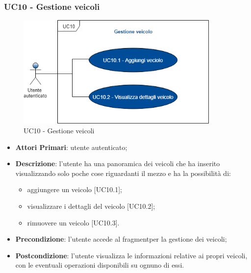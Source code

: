  \subsubsection{UC10 - Gestione veicoli}
  \begin{figure}[H]
 	\includegraphics[width=10cm]{res/images/UC10Gestioneveicolo.png}
 	\centering
 	\caption{UC10 - Gestione veicoli}
 \end{figure}
 \begin{itemize}
 	\item \textbf{Attori Primari}: utente autenticato;
 	\item \textbf{Descrizione}: l'utente ha una panoramica dei veicoli che ha inserito visualizzando solo poche cose riguardanti il mezzo e ha la possibilità di:
 	\begin{itemize}
 		\item aggiungere un veicolo [UC10.1];
 		\item visualizzare i dettagli del veicolo [UC10.2];
 		\item rimuovere un veicolo [UC10.3].
 	\end{itemize}
 	\item \textbf{Precondizione}: l'utente accede al fragment\glosp per la gestione dei veicoli;
 	\item \textbf{Postcondizione}: l'utente visualizza le informazioni relative ai propri veicoli, con le eventuali operazioni disponibili su ognuno di essi.
 \end{itemize}
